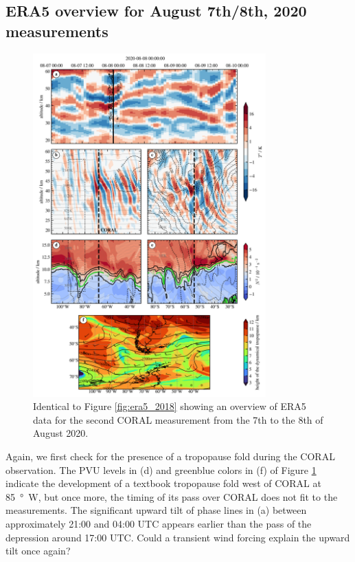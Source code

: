 \subsection*{ERA5 overview for August 7th/8th, 2020 measurements}
\begin{figure}[tbp]
    \centering
    \includegraphics[width=0.8\textwidth]{figures_lidar/era5_trop_strat_24.png}
    \caption{Identical to Figure \ref{fig:era5_2018} showing an overview of ERA5 data for the second CORAL measurement from the 7th to the 8th of August 2020.}
    \label{fig:era5_2020}
\end{figure}
Again, we first check for the presence of a tropopause fold during the CORAL observation. The PVU levels in (d) and greenblue colors in (f) of Figure \ref{fig:era5_2020} indicate the development of a textbook tropopause fold west of CORAL at \SI{85}{\degree W}, but once more, the timing of its pass over CORAL does not fit to the measurements. The significant upward tilt of phase lines in (a) between approximately 21:00 and 04:00 UTC appears earlier than the pass of the depression around 17:00 UTC. Could a transient wind forcing explain the upward tilt once again? \\
